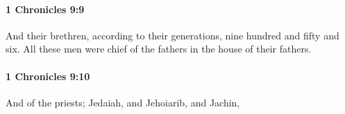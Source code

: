 		\paragraph{1 Chronicles 9:9} %
			\label{1CHRONICLES-9-9}

			And their brethren, according to their generations, nine hundred and fifty and six. All these men were chief of the fathers in the house of their fathers.


		\paragraph{1 Chronicles 9:10} %
			\label{1CHRONICLES-9-10}

			And of the priests; Jedaiah, and Jehoiarib, and Jachin,



